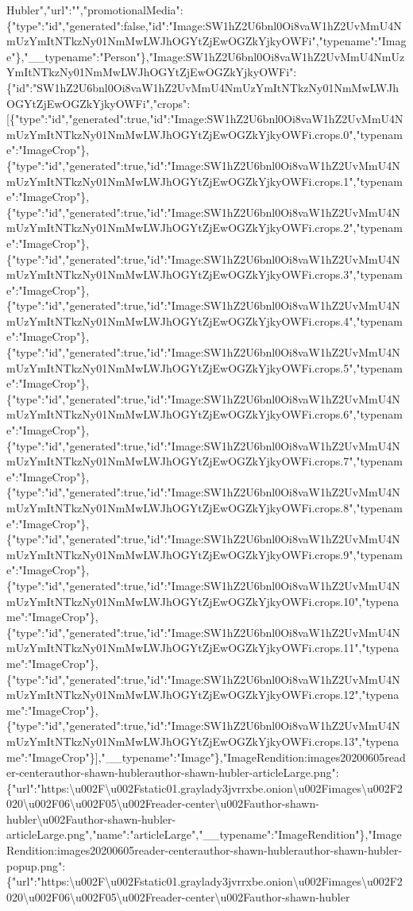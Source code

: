 Hubler","url":"","promotionalMedia":\{"type":"id","generated":false,"id":"Image:SW1hZ2U6bnl0Oi8vaW1hZ2UvMmU4NmUzYmItNTkzNy01NmMwLWJhOGYtZjEwOGZkYjkyOWFi","typename":"Image"\},"\_\_typename":"Person"\},"Image:SW1hZ2U6bnl0Oi8vaW1hZ2UvMmU4NmUzYmItNTkzNy01NmMwLWJhOGYtZjEwOGZkYjkyOWFi":\{"id":"SW1hZ2U6bnl0Oi8vaW1hZ2UvMmU4NmUzYmItNTkzNy01NmMwLWJhOGYtZjEwOGZkYjkyOWFi","crops":{[}\{"type":"id","generated":true,"id":"Image:SW1hZ2U6bnl0Oi8vaW1hZ2UvMmU4NmUzYmItNTkzNy01NmMwLWJhOGYtZjEwOGZkYjkyOWFi.crops.0","typename":"ImageCrop"\},\{"type":"id","generated":true,"id":"Image:SW1hZ2U6bnl0Oi8vaW1hZ2UvMmU4NmUzYmItNTkzNy01NmMwLWJhOGYtZjEwOGZkYjkyOWFi.crops.1","typename":"ImageCrop"\},\{"type":"id","generated":true,"id":"Image:SW1hZ2U6bnl0Oi8vaW1hZ2UvMmU4NmUzYmItNTkzNy01NmMwLWJhOGYtZjEwOGZkYjkyOWFi.crops.2","typename":"ImageCrop"\},\{"type":"id","generated":true,"id":"Image:SW1hZ2U6bnl0Oi8vaW1hZ2UvMmU4NmUzYmItNTkzNy01NmMwLWJhOGYtZjEwOGZkYjkyOWFi.crops.3","typename":"ImageCrop"\},\{"type":"id","generated":true,"id":"Image:SW1hZ2U6bnl0Oi8vaW1hZ2UvMmU4NmUzYmItNTkzNy01NmMwLWJhOGYtZjEwOGZkYjkyOWFi.crops.4","typename":"ImageCrop"\},\{"type":"id","generated":true,"id":"Image:SW1hZ2U6bnl0Oi8vaW1hZ2UvMmU4NmUzYmItNTkzNy01NmMwLWJhOGYtZjEwOGZkYjkyOWFi.crops.5","typename":"ImageCrop"\},\{"type":"id","generated":true,"id":"Image:SW1hZ2U6bnl0Oi8vaW1hZ2UvMmU4NmUzYmItNTkzNy01NmMwLWJhOGYtZjEwOGZkYjkyOWFi.crops.6","typename":"ImageCrop"\},\{"type":"id","generated":true,"id":"Image:SW1hZ2U6bnl0Oi8vaW1hZ2UvMmU4NmUzYmItNTkzNy01NmMwLWJhOGYtZjEwOGZkYjkyOWFi.crops.7","typename":"ImageCrop"\},\{"type":"id","generated":true,"id":"Image:SW1hZ2U6bnl0Oi8vaW1hZ2UvMmU4NmUzYmItNTkzNy01NmMwLWJhOGYtZjEwOGZkYjkyOWFi.crops.8","typename":"ImageCrop"\},\{"type":"id","generated":true,"id":"Image:SW1hZ2U6bnl0Oi8vaW1hZ2UvMmU4NmUzYmItNTkzNy01NmMwLWJhOGYtZjEwOGZkYjkyOWFi.crops.9","typename":"ImageCrop"\},\{"type":"id","generated":true,"id":"Image:SW1hZ2U6bnl0Oi8vaW1hZ2UvMmU4NmUzYmItNTkzNy01NmMwLWJhOGYtZjEwOGZkYjkyOWFi.crops.10","typename":"ImageCrop"\},\{"type":"id","generated":true,"id":"Image:SW1hZ2U6bnl0Oi8vaW1hZ2UvMmU4NmUzYmItNTkzNy01NmMwLWJhOGYtZjEwOGZkYjkyOWFi.crops.11","typename":"ImageCrop"\},\{"type":"id","generated":true,"id":"Image:SW1hZ2U6bnl0Oi8vaW1hZ2UvMmU4NmUzYmItNTkzNy01NmMwLWJhOGYtZjEwOGZkYjkyOWFi.crops.12","typename":"ImageCrop"\},\{"type":"id","generated":true,"id":"Image:SW1hZ2U6bnl0Oi8vaW1hZ2UvMmU4NmUzYmItNTkzNy01NmMwLWJhOGYtZjEwOGZkYjkyOWFi.crops.13","typename":"ImageCrop"\}{]},"\_\_typename":"Image"\},"ImageRendition:images20200605reader-centerauthor-shawn-hublerauthor-shawn-hubler-articleLarge.png":\{"url":"https:\textbackslash{}u002F\textbackslash{}u002Fstatic01.graylady3jvrrxbe.onion\textbackslash{}u002Fimages\textbackslash{}u002F2020\textbackslash{}u002F06\textbackslash{}u002F05\textbackslash{}u002Freader-center\textbackslash{}u002Fauthor-shawn-hubler\textbackslash{}u002Fauthor-shawn-hubler-articleLarge.png","name":"articleLarge","\_\_typename":"ImageRendition"\},"ImageRendition:images20200605reader-centerauthor-shawn-hublerauthor-shawn-hubler-popup.png":\{"url":"https:\textbackslash{}u002F\textbackslash{}u002Fstatic01.graylady3jvrrxbe.onion\textbackslash{}u002Fimages\textbackslash{}u002F2020\textbackslash{}u002F06\textbackslash{}u002F05\textbackslash{}u002Freader-center\textbackslash{}u002Fauthor-shawn-hubler\
